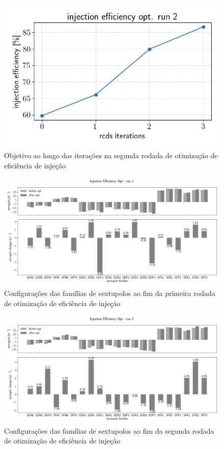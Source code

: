 \documentclass[a4paper,
               keeplastbox,   %
               ]{jacow}
\begin{document}
\begin{figure}
    \centering
    \includegraphics[width=\columnwidth]{injeff_hist_run2.png}
    \caption{Objetivo ao longo das iterações na segunda rodada de otimização de eficiência de injeção}
    \label{injeff_hist2}
\end{figure}


\begin{figure}[]
    \centering
    \includegraphics*[width=1\textwidth]{sexts_injeff_run1.png}
    \caption{Configurações das famílias de sextupolos ao fim da primeira rodada de otimização de eficiência de injeção}
    \label{inject_sexts1}
\end{figure}


\begin{figure}[]
    \centering
    \includegraphics*[width=\textwidth]{sexts_injeff_run2.png}
    \caption{Configurações das famílias de sextupolos ao fim da segunda rodada de otimização de eficiência de injeção}
    \label{inject_sexts2}
\end{figure}
\end{document}
